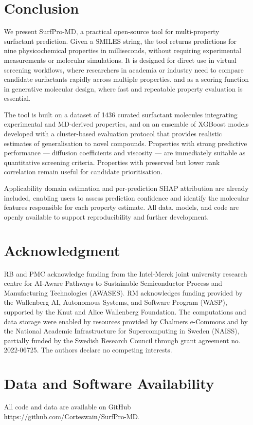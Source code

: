 \documentclass[11pt]{aime}
\begin{document}
\section{Conclusion}
We present SurfPro-MD, a practical open-source tool for multi-property surfactant prediction.
Given a SMILES string, the tool returns predictions for nine physicochemical properties in milliseconds, without requiring experimental measurements or molecular simulations.
It is designed for direct use in virtual screening workflows, where researchers in academia or industry need to compare candidate surfactants rapidly across multiple properties, and as a scoring function in generative molecular design, where fast and repeatable property evaluation is essential.

The tool is built on a dataset of 1436 curated surfactant molecules integrating experimental and MD-derived properties, and on an ensemble of XGBoost models developed with a cluster-based evaluation protocol that provides realistic estimates of generalisation to novel compounds.
Properties with strong predictive performance --- diffusion coefficients and viscosity --- are immediately suitable as quantitative screening criteria.
Properties with preserved but lower rank correlation remain useful for candidate prioritisation.

Applicability domain estimation and per-prediction SHAP attribution are already included, enabling users to assess prediction confidence and identify the molecular features responsible for each property estimate.
All data, models, and code are openly available to support reproducibility and further development.


\section*{Acknowledgment}
RB and PMC acknowledge funding from the Intel-Merck joint university research centre for AI-Aware Pathways to Sustainable Semiconductor Process and Manufacturing Technologies (AWASES).
RM acknowledges funding provided by the Wallenberg AI, Autonomous Systems, and Software Program (WASP), supported by the Knut and Alice Wallenberg Foundation.
The computations and data storage were enabled by resources provided by Chalmers e-Commons and by the National Academic Infrastructure for Supercomputing in Sweden (NAISS), partially funded by the Swedish Research Council through grant agreement no. 2022-06725.
The authors declare no competing interests.


\section*{Data and Software Availability}
All code and data are available on GitHub https://github.com/Corteswain/SurfPro-MD.
\end{document}
